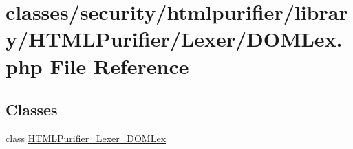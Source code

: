 \hypertarget{DOMLex_8php}{\section{classes/security/htmlpurifier/library/\+H\+T\+M\+L\+Purifier/\+Lexer/\+D\+O\+M\+Lex.php File Reference}
\label{DOMLex_8php}
}
\subsection*{Classes}
\begin{DoxyCompactItemize}
\item 
class \hyperlink{classHTMLPurifier__Lexer__DOMLex}{H\+T\+M\+L\+Purifier\+\_\+\+Lexer\+\_\+\+D\+O\+M\+Lex}
\end{DoxyCompactItemize}

